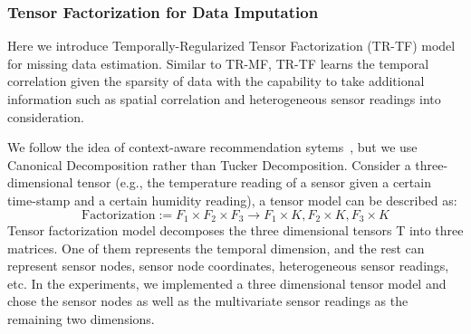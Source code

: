 \subsubsection{Tensor Factorization for Data Imputation} \label{sec:tfmissing}


Here we introduce Temporally-Regularized Tensor Factorization (TR-TF) model for missing data estimation. 
Similar to TR-MF, TR-TF learns the temporal correlation given the sparsity of data with the capability to take additional information such as spatial correlation and heterogeneous sensor readings into consideration.

We follow the idea of context-aware recommendation sytems~\cite{karatzoglou2010multiverse}, but we use Canonical Decomposition rather than Tucker Decomposition.
Consider a three-dimensional tensor (e.g., the temperature reading of a sensor given a certain time-stamp and a certain humidity reading), a tensor model can be described as:
\begin{equation*}
\mbox{Factorization} :=  F_1 \times  F_2 \times F_3 \rightarrow F_1 \times K, F_2 \times K, F_3 \times K
\end{equation*}
Tensor factorization model decomposes the three dimensional tensors T into three matrices. One of them represents the temporal dimension, and the rest can represent sensor nodes, sensor node coordinates, heterogeneous sensor readings, etc. In the experiments, we implemented a three dimensional tensor model and chose the sensor nodes as well as the multivariate sensor readings as the remaining two dimensions.

